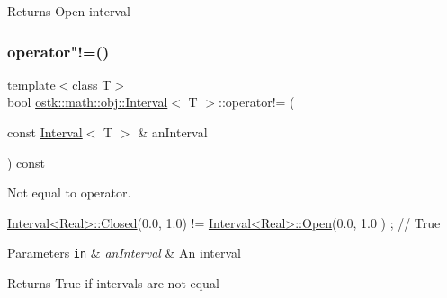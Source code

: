 \begin{DoxyReturn}{Returns}
Open interval 
\end{DoxyReturn}
\mbox{\label{classostk_1_1math_1_1obj_1_1_interval_a7bc7fa4fb1b04aa59337ad8f2704a38d}} 
\subsubsection{\texorpdfstring{operator"!=()}{operator!=()}}
{\footnotesize\ttfamily template$<$class T$>$ \\
bool \hyperlink{classostk_1_1math_1_1obj_1_1_interval}{ostk\+::math\+::obj\+::\+Interval}$<$ T $>$\+::operator!= (\begin{DoxyParamCaption}\item[{const \hyperlink{classostk_1_1math_1_1obj_1_1_interval}{Interval}$<$ T $>$ \&}]{an\+Interval }\end{DoxyParamCaption}) const}



Not equal to operator. 


\begin{DoxyCode}
\hyperlink{classostk_1_1math_1_1obj_1_1_interval_a48e9f436e8994c49026a1ecd503bc190}{Interval<Real>::Closed}(0.0, 1.0) != \hyperlink{classostk_1_1math_1_1obj_1_1_interval_ac80686dee5b2893e7b74a5120340db99}{Interval<Real>::Open}(0.0, 1.0
      ) ; \textcolor{comment}{// True}
\end{DoxyCode}



\begin{DoxyParams}[1]{Parameters}
\mbox{\tt in}  & {\em an\+Interval} & An interval \\
\hline
\end{DoxyParams}
\begin{DoxyReturn}{Returns}
True if intervals are not equal 
\end{DoxyReturn}
\mbox{\label{classostk_1_1math_1_1obj_1_1_interval_a0e3495dfad73a385d27621c7969a6f49}} 
